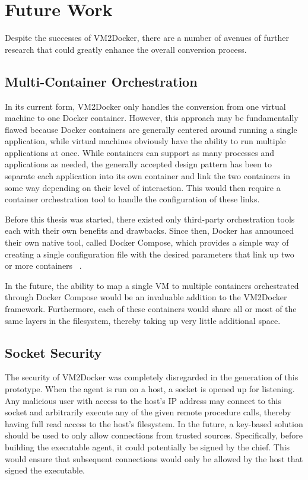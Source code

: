 \section{Future Work}
\label{sec:future}
Despite the successes of VM2Docker, there are a number of avenues of further research that could greatly enhance the overall conversion process.

\subsection{Multi-Container Orchestration}
In its current form, VM2Docker only handles the conversion from one virtual machine to one Docker container. However, this approach may be fundamentally flawed because Docker containers are generally centered around running a single application, while virtual machines obviously have the ability to run multiple applications at once. While containers can support as many processes and applications as needed, the generally accepted design pattern has been to separate each application into its own container and link the two containers in some way depending on their level of interaction. This would then require a container orchestration tool to handle the configuration of these links. 

Before this thesis was started, there existed only third-party orchestration tools each with their own benefits and drawbacks. Since then, Docker has announced their own native tool, called Docker Compose, which provides a simple way of creating a single configuration file with the desired parameters that link up two or more containers ~\cite{dockercompose}.

In the future, the ability to map a single VM to multiple containers orchestrated through Docker Compose would be an invaluable addition to the VM2Docker framework. Furthermore, each of these containers would share all or most of the same layers in the filesystem, thereby taking up very little additional space.

\subsection{Socket Security}
The security of VM2Docker was completely disregarded in the generation of this prototype. When the agent is run on a host, a socket is opened up for listening. Any malicious user with access to the host's IP address may connect to this socket and arbitrarily execute any of the given remote procedure calls, thereby having full read access to the host's filesystem. In the future, a key-based solution should be used to only allow connections from trusted sources. Specifically, before building the executable agent, it could potentially be signed by the chief. This would ensure that subsequent connections would only be allowed by the host that signed the executable.

